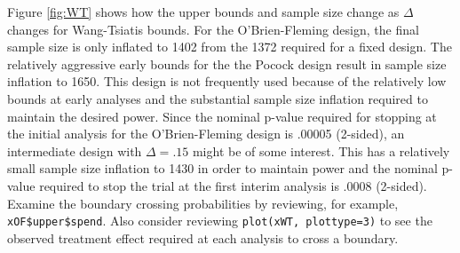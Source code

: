 Figure \ref{fig:WT} shows how the upper bounds and sample size change as $\Delta$ changes for Wang-Tsiatis bounds. 
For the O'Brien-Fleming design, the final sample size is only inflated to 1402 from the 1372 required for a fixed design.
The relatively aggressive early bounds for the the Pocock design result in sample size inflation to 1650. 
This design is not frequently used because of the relatively low bounds at early analyses and the substantial sample size inflation required to maintain the desired power. 
Since the nominal p-value required for stopping at the initial analysis for the O'Brien-Fleming design is .00005 (2-sided), an intermediate design with $\Delta=.15$ might be of some interest. 
This has a relatively small sample size inflation to 1430 in order to maintain power and the nominal p-value required to stop the trial at the first interim analysis is .0008 (2-sided).   
Examine the boundary crossing probabilities by reviewing, for example,
\texttt{xOF\$upper\$spend}.
Also consider reviewing \texttt{plot(xWT, plottype=3)} to see the observed treatment effect required at each analysis to cross a boundary.
